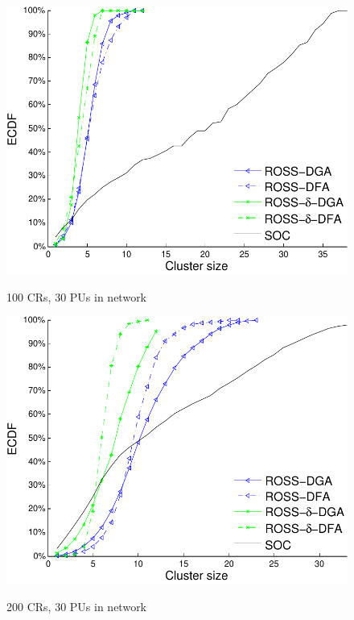 \documentclass[10pt,journal,compsoc]{IEEEtran}
\theoremstyle{mytheoremstyle}
\theoremstyle{mytheoremstyle}
\theoremstyle{mytheoremstyle}
\begin{document}
\begin{figure}[t]
\begin{multicols}{3}
    \includegraphics[width=\linewidth]{cdf_clusterSize_100.pdf}\par\caption{100 CRs, 30 PUs in network}\label{cdf_clusterSize_100}
    \includegraphics[width=\linewidth]{cdf_clusterSize_200.pdf}\par\caption{200 CRs, 30 PUs in network}\label{cdf_clusterSize_200}

\end{multicols}
\end{figure}
\end{document}

